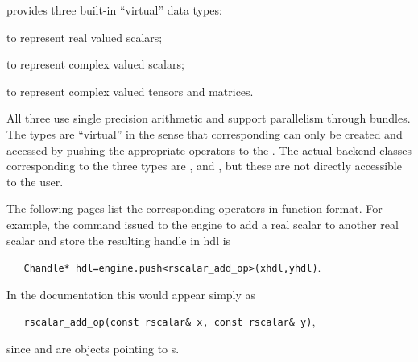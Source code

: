 \Cengine{} provides three built-in ``virtual'' data types:
\begin{compactenum}[~~\m{\circ}]
\item {} to represent real valued scalars;
\item {} to represent complex valued scalars;
\item {} to represent complex valued tensors and matrices. 
\end{compactenum} 
All three use single precision arithmetic and support parallelism through bundles. 
The types are ``virtual'' in the sense that corresponding can only be created and 
accessed by pushing the appropriate operators to the . 
The actual backend classes corresponding to the three types are ,  
and , but these are not directly accessible to the user. 

The following pages list the corresponding operators in function format. For example, the 
command issued to the engine to add a real scalar  to another real scalar  and store the 
resulting handle in hdl is 

\texttt{~~~Chandle* hdl=engine.push<rscalar\_add\_op>(xhdl,yhdl)}. 

In the documentation this would appear simply as 

\texttt{~~~rscalar\_add\_op(const rscalar\& x, const rscalar\& y)},

since  and  are  objects pointing to s. 
